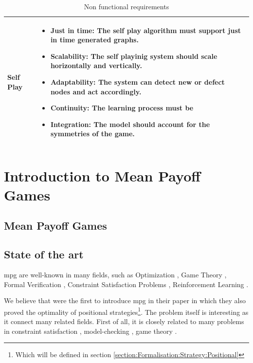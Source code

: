 \begin{table}[h]
\begin{tabularx}{\textwidth}{| p{3cm} | X |}
		\hline
		Self Play &\begin{itemize}
			\item \textbf{Just in time}: The self play algorithm must support just in time generated graphs.
			\item \textbf{Scalability}: The self playinig system should scale horizontally and vertically.
			\item \textbf{Adaptability}: The system can detect new or defect nodes and act accordingly.
			\item \textbf{Continuity}: The learning process must be 
			\item \textbf{Integration}: The model should account for the symmetries of the game.
		\end{itemize} \\
		
		\hline
	\end{tabularx}
	\caption{Non functional requirements
		\label{table:NonFunctionalRequirements}}
\end{table}
\section{Introduction to Mean Payoff Games}
\subsection{Mean Payoff Games}

\subsection{State of the art}
\acrfull{mpg} are well-known in many fields, such as Optimization \cite{SimplexMPG}, Game Theory \cite{PositionalStrategies}, Formal Verification \cite{OmegaSpecsMPG}, Constraint Satisfaction Problems  \cite{TropicalCSP,MPGMaxAtom}, Reinforcement Learning \cite{StrategyImprovement}.

We believe that \citeauthor{PositionalStrategies} were the first to introduce \acrshort{mpg} in their  paper \cite{PositionalStrategies} in which they also proved the optimality of positional strategies\footnote{Which will be defined in section \ref{section:Formalisation:Strategy:Positional}}. The problem itself is interesting as it connect many related fields. First of all, it is closely related to many problems in constraint satisfaction \cite{TropicalCSP,MPGMaxAtom}, model-checking \cite{OmegaSpecsMPG}, game theory \cite{PositionalStrategies}.

